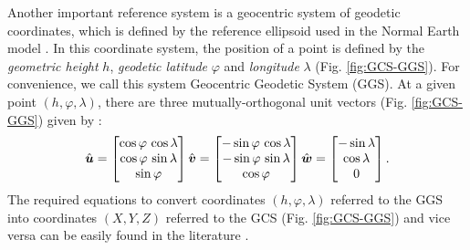 \documentclass[extra]{gji}
\begin{document}
Another important reference system is a geocentric system of
geodetic coordinates, which is defined by the reference ellipsoid
used in the Normal Earth model \citep{heiskanen-moritz1967, soler1976,
torge2012, bouman_etal2013}.
In this coordinate system, the position of a point
is defined by the \textit{geometric height} $h$,
\textit{geodetic latitude} $\varphi$ and \textit{longitude} $\lambda$ (Fig. \ref{fig:GCS-GGS}).
For convenience, we call this system Geocentric Geodetic System
(GGS).
At a given point $(h, \varphi, \lambda)$, there are three
mutually-orthogonal unit vectors (Fig. \ref{fig:GCS-GGS}) given by \citep{soler1976}:
\begin{equation}
\hat{\mitbf{u}} =
\begin{bmatrix}
\cos\varphi \, \cos\lambda \\
\cos\varphi \, \sin\lambda \\
\sin\varphi
\end{bmatrix}
\hat{\mitbf{v}} =
\begin{bmatrix}
-\sin\varphi \, \cos\lambda \\
-\sin\varphi \, \sin\lambda \\
\cos\varphi
\end{bmatrix}
\hat{\mitbf{w}} =
\begin{bmatrix}
-\sin\lambda \\
\cos\lambda \\
0
\end{bmatrix} .
\label{eq:unit-vectors}
\end{equation}
The required equations to convert coordinates $(h, \varphi,
\lambda)$ referred to the GGS into coordinates $(X, Y, Z)$ referred to
the GCS (Fig. \ref{fig:GCS-GGS}) and vice versa can be easily found in
the literature \citep[e.g.,][]{heiskanen-moritz1967, torge2012,
bouman_etal2013}.
\end{document}
